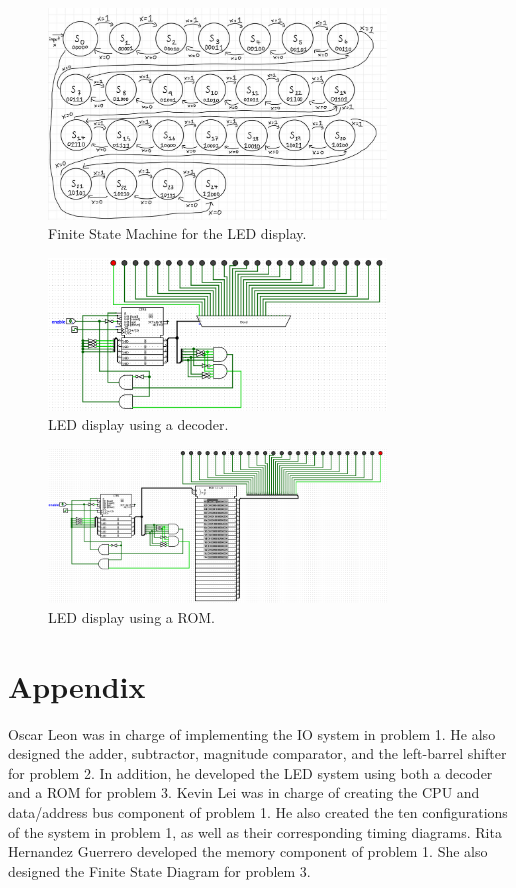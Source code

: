 \documentclass{article}
\begin{document}
\begin{figure}[H]
    \centering
    \includegraphics[width=0.8\textwidth]{./images/FSM.png}
    \caption{Finite State Machine for the LED display.}
\end{figure}

\begin{figure}[H]
    \centering
    \includegraphics[width=0.8\textwidth]{./images/LED_decoder.png}
    \caption{LED display using a decoder.}
\end{figure}

\begin{figure}[H]
    \centering
    \includegraphics[width=0.8\textwidth]{./images/LED_ROM.png}
    \caption{LED display using a ROM.}
\end{figure}

\newpage
\section*{Appendix}
Oscar Leon was in charge of implementing the IO system in problem 1. He also designed the adder, subtractor, magnitude comparator, and the left-barrel shifter for problem 2. In addition, he developed the LED system using both a decoder and a ROM for problem 3.
Kevin Lei was in charge of creating the CPU and data/address bus component of problem 1. He also created the ten configurations of the system in problem 1, as well as their corresponding timing diagrams. 
Rita Hernandez Guerrero developed the memory component of problem 1. She also designed the Finite State Diagram for problem 3. 
\end{document}
